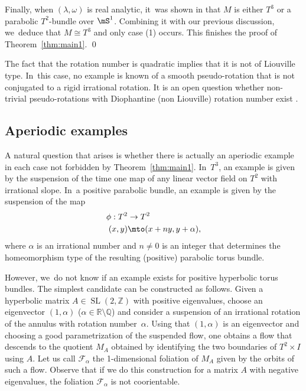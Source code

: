 Finally, when $(\lambda,\omega)$ is real analytic, it~was shown in \cite[\S 4]{Re} that $M$ is either $T^3$ or a parabolic $T^2$-bundle over $\mS^1$. Combining it with our previous discussion, we~deduce that $M\cong T^3$ and only case (1) occurs. This finishes the proof of Theorem~\ref{thm:main1}.
\hfill \qed

\begin{Remark}\label{rem: pseudo-rotation}
The fact that the rotation number is quadratic implies that it is not of Liouville type. In~this case, no example is known of a smooth pseudo-rotation that is not conjugated to a rigid irrational rotation. It is an open question whether non-trivial pseudo-rotations with Diophantine (\ie non Liouville) rotation number exist \cite{FK}.
\end{Remark}

\subsection{Aperiodic examples}
A natural question that arises is whether there is actually an aperiodic example in each case not forbidden by Theorem~\ref{thm:main1}. In~$T^3$, an example is given by the suspension of the time one map of any linear vector field on $T^2$ with irrational slope. In~a positive parabolic bundle, an example is given by the suspension of the map
\begin{align*}
\phi: T^2 &\to T^2\\
	 (x,y) &\mto (x+ny,y+\alpha),
\end{align*}
where $\alpha$ is an irrational number and $n\neq 0$ is an integer that determines the homeomorphism type of the resulting (positive) parabolic torus bundle.

However, we~do not know if an example exists for positive hyperbolic torus bundles. The simplest candidate can be constructed as follows. Given a hyperbolic matrix $A\in \operatorname{SL}(2,\mathbb{Z})$ with positive eigenvalues, choose an eigenvector $(1,\alpha)$
($\alpha \in \mathbb{R}\setminus \mathbb{Q}$) and consider a suspension of an irrational rotation of the annulus with rotation number~$\alpha$. Using that $(1,\alpha)$ is an eigenvector and choosing a good parametrization of the suspended flow, one obtains a flow that descends to the quotient $M_A$ obtained by identifying the two boundaries of $T^2\times I$ using $A$. Let us call $\mathcal{F}_\alpha$ the 1-dimensional foliation of $M_A$ given by the orbits of such a flow. Observe that if we do this construction for a matrix $A$ with negative eigenvalues, the foliation $\mathcal{F}_\alpha$ is not coorientable.

